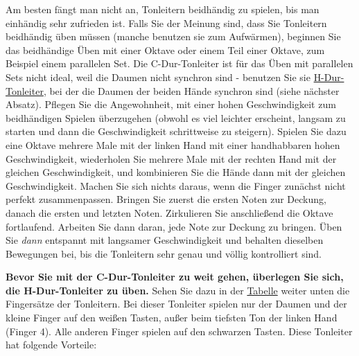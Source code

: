 Am besten fängt man nicht an, Tonleitern beidhändig zu spielen, bis man einhändig sehr zufrieden ist.
Falls Sie der Meinung sind, dass Sie Tonleitern beidhändig üben müssen (manche benutzen sie zum Aufwärmen), beginnen Sie das beidhändige Üben mit einer Oktave oder einem Teil einer Oktave, zum Beispiel einem parallelen Set.
Die C-Dur-Tonleiter ist für das Üben mit parallelen Sets nicht ideal, weil die Daumen nicht synchron sind - benutzen Sie sie \hyperref[hdur]{H-Dur-Tonleiter}, bei der die Daumen der beiden Hände synchron sind (siehe nächster Absatz).
Pflegen Sie die Angewohnheit, mit einer hohen Geschwindigkeit zum beidhändigen Spielen überzugehen (obwohl es viel leichter erscheint, langsam zu starten und dann die Geschwindigkeit schrittweise zu steigern).
Spielen Sie dazu eine Oktave mehrere Male mit der linken Hand mit einer handhabbaren hohen Geschwindigkeit, wiederholen Sie mehrere Male mit der rechten Hand mit der gleichen Geschwindigkeit, und kombinieren Sie die Hände dann mit der gleichen Geschwindigkeit.
Machen Sie sich nichts daraus, wenn die Finger zunächst nicht perfekt zusammenpassen.
Bringen Sie zuerst die ersten Noten zur Deckung, danach die ersten und letzten Noten.
Zirkulieren Sie anschließend die Oktave fortlaufend.
Arbeiten Sie dann daran, jede Note zur Deckung zu bringen.
Üben Sie \textit{dann} entspannt mit langsamer Geschwindigkeit und behalten dieselben Bewegungen bei, bis die Tonleitern sehr genau und völlig kontrolliert sind.


\label{hdur}

\textbf{Bevor Sie mit der C-Dur-Tonleiter zu weit gehen, überlegen Sie sich, die H-Dur-Tonleiter zu üben.}
Sehen Sie dazu in der \hyperref[table]{Tabelle} weiter unten die Fingersätze der Tonleitern.
Bei dieser Tonleiter spielen nur der Daumen und der kleine Finger auf den weißen Tasten, außer beim tiefsten Ton der linken Hand (Finger 4).
Alle anderen Finger spielen auf den schwarzen Tasten.
Diese Tonleiter hat folgende Vorteile:

